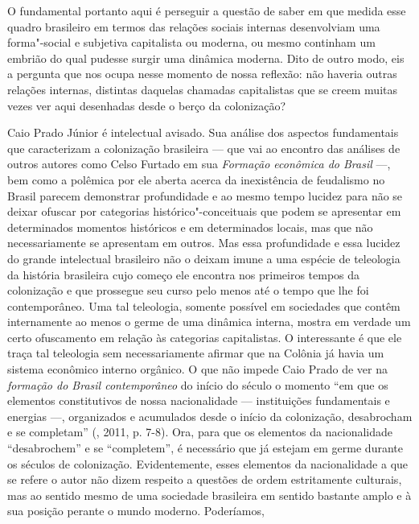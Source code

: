 O fundamental portanto aqui é perseguir a questão de saber em que medida
esse quadro brasileiro em termos das relações sociais internas
desenvolviam uma forma"-social e subjetiva capitalista ou moderna, ou
mesmo continham um embrião do qual pudesse surgir uma dinâmica moderna.
Dito de outro modo, eis a pergunta que nos ocupa nesse momento de nossa
reflexão: não haveria outras relações internas, distintas daquelas
chamadas capitalistas que se creem muitas vezes ver aqui desenhadas
desde o berço da colonização?

Caio Prado Júnior é intelectual avisado. Sua análise dos aspectos
fundamentais que caracterizam a colonização brasileira --- que vai ao
encontro das análises de outros autores como Celso Furtado em sua
\emph{Formação econômica do Brasil} ---, bem como a polêmica por ele
aberta acerca da inexistência de feudalismo no Brasil parecem demonstrar
profundidade e ao mesmo tempo lucidez para não se deixar ofuscar por
categorias histórico"-conceituais que podem se apresentar em determinados
momentos históricos e em determinados locais, mas que não
necessariamente se apresentam em outros. Mas essa profundidade e essa
lucidez do grande intelectual brasileiro não o deixam imune a uma
espécie de teleologia da história brasileira cujo começo ele encontra
nos primeiros tempos da colonização e que prossegue seu curso pelo menos
até o tempo que lhe foi contemporâneo. Uma tal teleologia, somente
possível em sociedades que contêm internamente ao menos o germe de
uma dinâmica interna, mostra em verdade um certo ofuscamento em relação
às categorias capitalistas. O interessante é que ele traça tal
teleologia sem necessariamente afirmar que na Colônia já havia um
sistema econômico interno orgânico. O que não impede Caio Prado de ver
na \emph{formação do Brasil contemporâneo} do início do século  o
momento ``em que os elementos constitutivos de nossa nacionalidade ---
instituições fundamentais e energias ---, organizados e acumulados desde
o início da colonização, desabrocham e se completam'' (, 2011, p.
7-8). Ora, para que os elementos da nacionalidade ``desabrochem'' e se
``completem'', é necessário que já estejam em germe durante os séculos
de colonização. Evidentemente, esses elementos da nacionalidade a que se
refere o autor não dizem respeito a questões de ordem estritamente
culturais, mas ao sentido mesmo de uma sociedade brasileira em sentido
bastante amplo e à sua posição perante o mundo moderno. Poderíamos,
